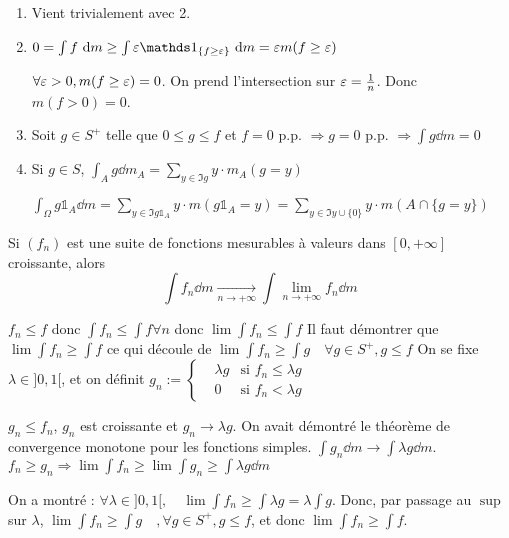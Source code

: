 \documentclass[10pt,a4paper,notitlepage ]{report}
\begin{document}
\begin{demo}
	\begin{enumerate}
		\item Vient trivialement avec 2.
		\item $0=\int f\dd m \ge \int \eps \mathds 1_{\{f\ge \eps\}} \dd m =\eps m(f\ge \eps)$
		
		$\forall \varepsilon > 0, m(f\ge \varepsilon) = 0$. On prend l'intersection sur $\varepsilon = \frac 1 n$. Donc $m(f>0) = 0$.
		\item Soit $g\in S^+$ telle que $0 \le g\le f$ et $f=0$ p.p. $\Rightarrow g =0$ p.p. $\Rightarrow \int g \dd m = 0$
		\item Si $g \in S$, $\int_A g \dd m_A = \underset{y \in \Im g}\sum y\cdot m_A(g=y)$
		
		$\int_\Omega g \mathds 1_A \dd m = \underset{y\in\Im g\mathds 1_A}\sum y \cdot m(g\mathds 1_A=y) = \underset{y\in \Im y \cup \{0\}}\sum y\cdot m(A\cap \{g=y\})$
	\end{enumerate}
\end{demo}

\begin{theorem}
	Si $(f_n)$ est une suite de fonctions mesurables à valeurs dans $[0,+\infty]$ croissante, alors 
	\[ \int f_n \dd m \underset{n\rightarrow + \infty} \longrightarrow \int \underset{n\rightarrow + \infty} \lim f_n \dd m \]
\end{theorem}

\begin{demo}
	$f_n \le f$ donc $\int f_n \le \int f \forall n$ donc $\lim \int f_n \le \int f$
	Il faut démontrer que $\lim \int f_n \ge \int f$ ce qui découle de $\lim \int f_n \ge \int g \quad \forall g\in S^+, g\le f$
	On se fixe $\lambda \in ]0,1[$, et on définit $g_n := \left\{ \begin{aligned}
		&\lambda g &\text{si } f_n\le \lambda g \\
		& 0 &\text{si } f_n < \lambda g
	\end{aligned}\right.$

	$g_n \le f_n$, $g_n$ est croissante et $g_n \rightarrow \lambda g$. On avait démontré le théorème de convergence monotone pour les fonctions simples.
	$\int g_n \dd m \rightarrow \int \lambda g \dd m$.
	$f_n \ge g_n \Rightarrow \lim\int f_n \ge \lim \int g_n \ge \int \lambda g \dd m$
	
	On a montré : $\forall \lambda \in ]0,1[, \quad \lim \int f_n \ge \int \lambda g = \lambda \int g$. Donc, par passage au $\sup$ sur $\lambda$, $\lim \int f_n \ge \int g \quad, \forall g \in S^+, g \le f$, et donc $\lim \int f_n \ge \int f$.
\end{demo}
\end{document}

